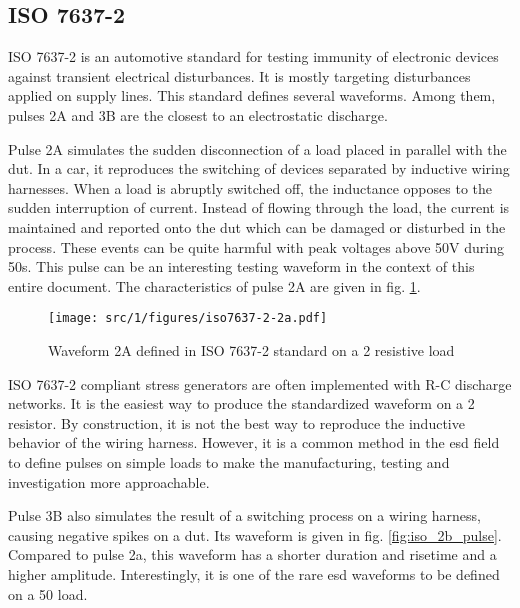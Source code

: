 
\subsection{ISO 7637-2}

ISO 7637-2\cite{iso7637-2} is an automotive standard for testing immunity of electronic devices against transient electrical disturbances.
It is mostly targeting disturbances applied on supply lines.
This standard defines several waveforms.
Among them, pulses 2A and 3B are the closest to an electrostatic discharge.

Pulse 2A simulates the sudden disconnection of a load placed in parallel with the \gls{dut}.
In a car, it reproduces the switching of devices separated by inductive wiring harnesses.
When a load is abruptly switched off, the inductance opposes to the sudden interruption of current.
Instead of flowing through the load, the current is maintained and reported onto the \gls{dut} which can be damaged or disturbed in the process.
These events can be quite harmful with peak voltages above 50V during 50\textmu{}s.
This pulse can be an interesting testing waveform in the context of this entire document.
The characteristics of pulse 2A are given in fig. \ref{fig:iso_2a_pulse}.

\begin{figure}[!h]
  \centering
  \texttt{[image: src/1/figures/iso7637-2-2a.pdf]}
  \caption{Waveform 2A defined in ISO 7637-2 standard on a 2\textOmega{} resistive load}
  \label{fig:iso_2a_pulse}
\end{figure}

ISO 7637-2 compliant stress generators are often implemented with R-C discharge networks.
It is the easiest way to produce the standardized waveform on a 2\textOmega{} resistor.
By construction, it is not the best way to reproduce the inductive behavior of the wiring harness.
However, it is a common method in the \gls{esd} field to define pulses on simple loads to make the manufacturing, testing and investigation more approachable.

Pulse 3B also simulates the result of a switching process on a wiring harness, causing negative spikes on a \gls{dut}.
Its waveform is given in fig. \ref{fig:iso_2b_pulse}.
Compared to pulse 2a, this waveform has a shorter duration and risetime and a higher amplitude.
Interestingly, it is one of the rare \gls{esd} waveforms to be defined on a 50\textOmega{} load.

